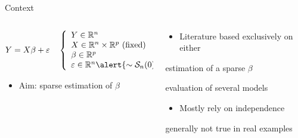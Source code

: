 \documentclass[,table]{beamer}
\newcommand{\soustitre}[1]{\vspace{5pt}{\small\textbf{\textcolor{bleuL}{#1}}}} %
\begin{document}
\begin{frame}{}
  \vfill
  \begin{columns}
    \begin{column}{.915\paperwidth}
      \begin{block}{Context}
        \begin{columns}[t]
          \begin{column}{.45\linewidth}
            \soustitre{Linear regression model}
            \begin{displaymath}
              Y = X\beta + \varepsilon \quad \left\{
                \begin{array}{l}
                  Y \in\mathbb{R}^n\\ X
                  \in\mathbb{R}^n\times\mathbb{R}^p \text{
                    (fixed)}\\ \beta \in \mathbb{R}^p \\
                  \varepsilon \in \mathbb{R}^n \alert{\sim \mathcal{S}_n(0)}
                \end{array}
              \right.
            \end{displaymath}
            \begin{itemize}
            \item Aim: sparse estimation of $\beta$
            \end{itemize}
          \end{column}
          \begin{column}{.45\linewidth}
            \vspace{-15pt}
            \begin{itemize}
            \item Literature based exclusively on either
            \end{itemize}
            \begin{list}{-}{\leftmargin=2em}
            \item estimation of a sparse $\beta$
            \item evaluation of several models
            \end{list}

            \vspace{10pt}
            \begin{itemize}
            \item Mostly rely on independence 
            \end{itemize}
            \begin{list}{-}{\leftmargin=2em}
            \item generally not true in real examples
            \end{list}
          \end{column}
        \end{columns}
      \end{block}
    \end{column}
  \end{columns}


\end{frame}
\end{document}
